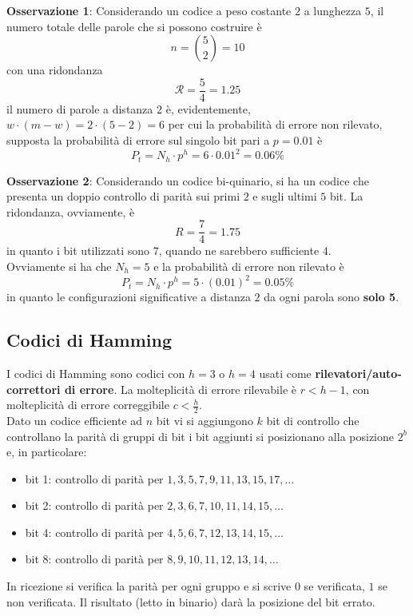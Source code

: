\documentclass[a4paper]{extarticle}
\begin{document}
\vspace{1em}
\noindent
\textbf{Osservazione 1}: Considerando un codice a peso costante $2$ a lunghezza $5$, il numero totale delle parole che si possono costruire è
\[n=\binom{5}{2}=10\]
con una ridondanza
\[\mathcal{R}=\frac{5}{4}=1.25\]
il numero di parole a distanza $2$ è, evidentemente,
$w \cdot (m-w) = 2 \cdot (5-2)=6$
per cui la probabilità di errore non rilevato, supposta la probabilità di errore sul singolo bit pari a $p=0.01$ è
\[P_t=N_h \cdot p^h=6 \cdot 0.01^2=0.06\%\]

\vspace{1em}
\noindent
\textbf{Osservazione 2}: Considerando un codice bi-quinario, si ha un codice che presenta un doppio controllo di parità sui primi $2$ e sugli ultimi $5$ bit. La ridondanza, ovviamente, è
\[R=\frac{7}{4}=1.75\]
in quanto i bit utilizzati sono $7$, quando ne sarebbero sufficiente $4$.\\
Ovviamente si ha che $N_h=5$ e la probabilità di errore non rilevato è
\[P_t = N_h \cdot p^h = 5 \cdot (0.01)^2 = 0.05 \%\]
in quanto le configurazioni significative a distanza $2$ da ogni parola sono \textbf{solo 5}.

\vspace{1em}
\subsection{Codici di Hamming}
I codici di Hamming sono codici con $h=3$ o $h=4$ usati come \textbf{rilevatori/auto-correttori di errore}. La molteplicità di errore rilevabile è $r<h-1$, con molteplicità di errore correggibile $c<\frac{h}{2}$.\\
Dato un codice efficiente ad $n$ bit vi si aggiungono $k$ bit di controllo che controllano la parità di gruppi di bit i bit aggiunti si posizionano alla posizione $2^b$ e, in particolare:
\begin{itemize}
    \item bit 1: controllo di parità per $1,3,5,7,9,11,13,15,17,\dots$
    \item bit 2: controllo di parità per $2,3,6,7,10,11,14,15,\dots$
    \item bit 4: controllo di parità per $4,5,6,7,12,13,14,15,\dots$
    \item bit 8: controllo di parità per $8,9,10,11,12,13,14,\dots$
\end{itemize}
In ricezione si verifica la parità per ogni gruppo e si scrive $0$ se verificata, $1$ se non verificata. Il risultato (letto in binario) darà la posizione del bit errato.
\end{document}
